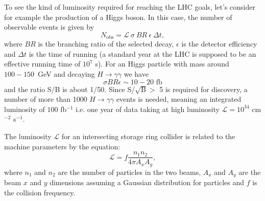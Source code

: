 To see the kind of luminosity required for reaching the LHC goals, let's
consider for example the production of a Higgs boson.
In this case,  the number of observable events is given by
\begin{equation}\label{eq:NEvent}
N_{\mbox{obs}} = \mathcal L\ \sigma\ BR\ \epsilon\ \Delta t,
\end{equation}
where $BR$ is the branching ratio of the selected decay, $\epsilon$ is the detector efficiency and $\Delta t$ is the time of running (a standard year at the LHC is supposed to be an effective running time of $10^{7}$ s). For an Higgs particle with mass around $100 -150$~GeV and decaying $H \rightarrow \gamma\gamma$ we have \cite{slideGiacomo}
\begin{equation}\label{eq:higgs1}
\sigma BR \epsilon \sim 10-20 \mbox{ fb}
\end{equation}
and the ratio S/B is about 1/50. Since S/$\sqrt{\mbox{B}} >$ 5 is required for discovery, a number of more than 1000 $H \rightarrow \gamma\gamma$ events is needed, meaning an integrated luminosity of $100$ fb$^{-1}$ i.e. one year of data taking at high luminosity $\mathcal L = 10^{34}$ cm$^{-2}$ s$^{-1}$.

The luminosity $\mathcal L$ for an intersecting storage ring collider 
is related to the machine parameters by the equation:
\begin{equation}\label{eq:lumi}
\mathcal L = f \dfrac{n_{1}n_{2}}{4\pi A_{x}A_{y}},
\end{equation}
where $n_{1}$ and $n_{2}$ are the number of particles in the two beams, $A_{x}$ and $A_{y}$ are the beam $x$ and $y$ dimensions assuming a Gaussian distribution for particles and $f$ is the collision frequency. 

